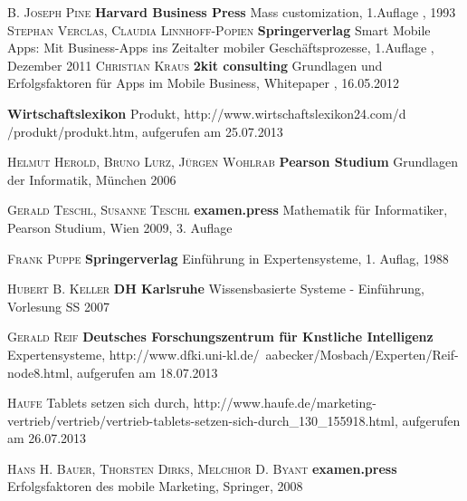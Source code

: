 \begin{thebibliography}{---}
             \textsc{B. Joseph Pine}
            \textbf{Harvard Business Press}
            Mass customization, 1.Auflage , 1993
             \textsc{Stephan Verclas, Claudia Linnhoff-Popien}
            \textbf{Springerverlag}
            Smart Mobile Apps: Mit Business-Apps ins Zeitalter mobiler Geschäftsprozesse, 1.Auflage , Dezember 2011
             \textsc{Christian Kraus}
            \textbf{2kit consulting}
            Grundlagen und Erfolgsfaktoren 
            für Apps im Mobile Business, Whitepaper , 16.05.2012

            \textbf{Wirtschaftslexikon}
            Produkt, http://www.wirtschaftslexikon24.com/d /produkt/produkt.htm, aufgerufen am 25.07.2013
            
 			\textsc{Helmut Herold, Bruno Lurz, Jürgen Wohlrab}
             \textbf{Pearson Studium}
             Grundlagen der Informatik, München 2006
             
  			\textsc{Gerald Teschl, Susanne Teschl}
              \textbf{examen.press}
              Mathematik
              für Informatiker, Pearson Studium, Wien 2009, 3. Auflage
                         			 
 			 \textsc{Frank Puppe}
 			 \textbf{Springerverlag}
 			 Einführung in Expertensysteme, 1. Auflag, 1988
 			 
  			 \textsc{Hubert B. Keller}
  			 \textbf{DH Karlsruhe}
  			 Wissensbasierte Systeme - Einführung, Vorlesung SS 2007
  			 
			\textsc{Gerald Reif}
            \textbf{Deutsches Forschungszentrum für Knstliche Intelligenz}
            Expertensysteme, http://www.dfki.uni-kl.de/~aabecker/Mosbach/Experten/Reif-node8.html, aufgerufen am 18.07.2013
 
            \textsc{Haufe}
           Tablets setzen sich durch, http://www.haufe.de/marketing-vertrieb/vertrieb/vertrieb-tablets-setzen-sich-durch\_130\_155918.html, aufgerufen am 26.07.2013           
            
   			\textsc{Hans H. Bauer, Thorsten Dirks, Melchior D. Byant}
               \textbf{examen.press}
               Erfolgsfaktoren des mobile Marketing, Springer, 2008
               

\end{thebibliography}
